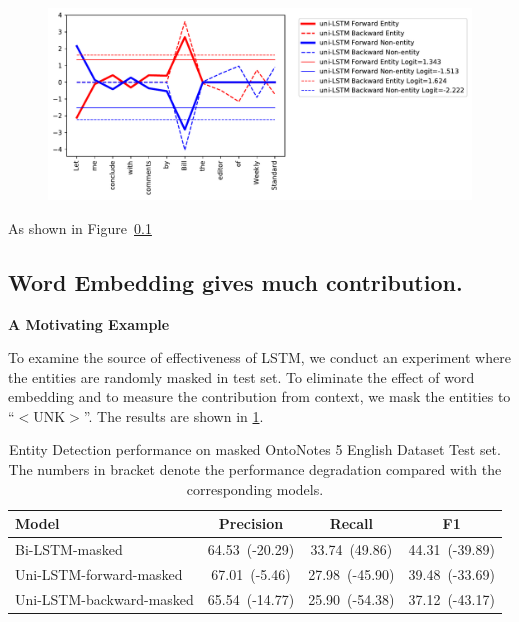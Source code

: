 \documentclass{article}
\begin{document}
\begin{figure}[t]
	\centering
	\includegraphics[width=\linewidth]{uni-Bill.pdf}
	\label{fig:Bill}
\end{figure}

As shown in Figure~\ref{}




\subsection{Word Embedding gives much contribution.}

\noindent \textbf{A Motivating Example} 

To examine the source of effectiveness of LSTM, we conduct an experiment where the entities are randomly masked in test set. To eliminate the effect of word embedding and to measure the contribution from context, we mask the entities to ``$<$UNK$>$''. The results are shown in \ref{tab:mask}.


\begin{table}[t]
	\centering
	\begin{tabular}{l@{\qquad}ccc}
		\toprule
		\textbf{Model}		& \textbf{Precision}	& \textbf{Recall}	& \textbf{F1} \\ \midrule
		Bi-LSTM-masked 	& 64.53~(-20.29) 			& 33.74~(49.86)			& 44.31~(-39.89) \\ 
		Uni-LSTM-forward-masked & 67.01~(-5.46) 		& 27.98~(-45.90) 			& 39.48~(-33.69) \\ 
		Uni-LSTM-backward-masked& 65.54~(-14.77) 		& 25.90~(-54.38)			& 37.12~(-43.17) \\ 
		\bottomrule
	\end{tabular}
	\vspace{3mm}
	\caption{Entity Detection performance on masked OntoNotes 5 English Dataset Test set. The numbers in bracket denote the performance degradation compared with the corresponding models.}
	\label{tab:mask}
\end{table}
\end{document}
